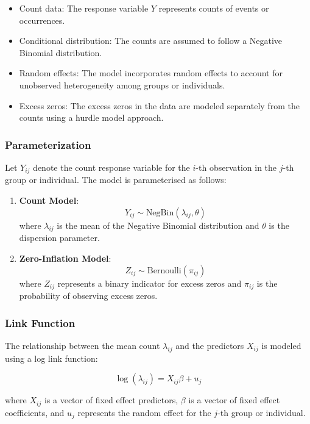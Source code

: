 \documentclass[
]{article}
\begin{document}
\begin{itemize}
    \item Count data: The response variable \(Y\) represents counts of events or occurrences.
    \item Conditional distribution: The counts are assumed to follow a Negative Binomial distribution.
    \item Random effects: The model incorporates random effects to account for unobserved heterogeneity among groups or individuals.
    \item Excess zeros: The excess zeros in the data are modeled separately from the counts using a hurdle model approach.
\end{itemize}

\subsubsection{Parameterization}\label{parameterization}

Let \(Y_{ij}\) denote the count response variable for the \(i\)-th
observation in the \(j\)-th group or individual. The model is
parameterised as follows:

\begin{enumerate}
    \item \textbf{Count Model}:
    \[
    Y_{ij} \sim \text{NegBin}(\lambda_{ij}, \theta)
    \]
    where \(\lambda_{ij}\) is the mean of the Negative Binomial distribution and \(\theta\) is the dispersion parameter.
    
    \item \textbf{Zero-Inflation Model}:
    \[
    Z_{ij} \sim \text{Bernoulli}(\pi_{ij})
    \]
    where \(Z_{ij}\) represents a binary indicator for excess zeros and \(\pi_{ij}\) is the probability of observing excess zeros.
\end{enumerate}

\subsubsection{Link Function}\label{link-function}

The relationship between the mean count \(\lambda_{ij}\) and the
predictors \(X_{ij}\) is modeled using a log link function:

\[
\log(\lambda_{ij}) = X_{ij}\beta + u_j
\]

where \(X_{ij}\) is a vector of fixed effect predictors, \(\beta\) is a
vector of fixed effect coefficients, and \(u_j\) represents the random
effect for the \(j\)-th group or individual.
\end{document}
